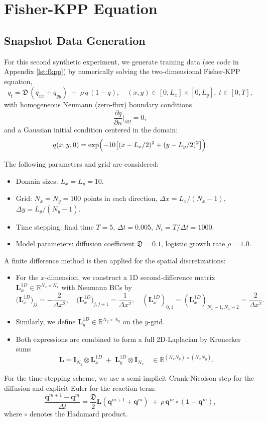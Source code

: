 \section{Fisher-KPP Equation}
\label{sec:fkpp_eq}

\subsection*{Snapshot Data Generation}

For this second synthetic experiment, we generate training data (see code in Appendix \ref{lst:fkpp}) by numerically solving the two-dimensional Fisher-KPP equation,\\
$$q_t = \mathfrak{D}\,(q_{xx} + q_{yy}) \;+\; \rho\,q\,(1 - q), \quad (x,y)\in[0,L_x]\times[0,L_y],\;t\in[0,T],$$
with homogeneous Neumann (zero-flux) boundary conditions\\
$$\frac{\partial q}{\partial n}\Big|_{\partial\Omega} = 0,$$
and a Gaussian initial condition centered in the domain:\\
$$q(x,y,0)= \exp\Bigl(-10\bigl[(x - L_x/2)^2 + (y - L_y/2)^2\bigr]\Bigr).$$

The following parameters and grid are considered:
\begin{itemize}
  \item Domain sizes: $L_x = L_y = 10$.
  \item Grid: $N_x = N_y = 100$ points in each direction, $\Delta x = L_x/(N_x-1)$, $\Delta y = L_y/(N_y-1)$.
  \item Time stepping: final time $T=5$, $\Delta t=0.005$, $N_t = T/\Delta t = 1000$.
  \item Model parameters: diffusion coefficient $\mathfrak{D}=0.1$, logistic growth rate $\rho=1.0$.
\end{itemize}
A finite difference method is then applied for the spatial discretizations:
\begin{itemize}
  \item For the $x$-dimension, we construct a 1D second-difference matrix $\mathbf{L}_x^{1D}\in\mathbb R^{N_x\times N_x}$ with Neumann BCs by\\
$$\bigl(\mathbf{L}_x^{1D}\bigr)_{jj}= -\frac{2}{\Delta x^2}, \quad \bigl(\mathbf{L}_x^{1D}\bigr)_{j,j\pm1}= \frac{1}{\Delta x^2},
      \quad (\mathbf{L}_x^{1D})_{0,1} = (\mathbf{L}_x^{1D})_{N_x-1,N_x-2} = \frac{2}{\Delta x^2}.$$
  \item Similarly, we define \(\mathbf{L}_y^{1D}\in\mathbb R^{N_y\times N_y}\) on the \(y\)-grid.
  \item Both expressions are combined to form a full 2D-Laplacian by Kronecker sums\\
    $$\mathbf{L} = \mathbf{I}_{N_y}\otimes \mathbf{L}_x^{1D} \;+\; \mathbf{L}_y^{1D}\otimes \mathbf{I}_{N_x}\quad\in\mathbb R^{(N_xN_y)\times(N_xN_y)}.$$
\end{itemize}
For the time-stepping scheme, we use a semi-implicit Crank-Nicolson step for the diffusion and explicit Euler for the reaction term:\\
$$\dfrac{\mathbf{q}^{m+1} - \mathbf{q}^{m}}{\Delta t} = \dfrac{\mathfrak{D}}{2}\mathbf{L}(\mathbf{q}^{m+1}+\mathbf{q}^m)\;+\,\rho\,\mathbf{q}^m\circ(\mathbf{1} - \mathbf{q}^m),$$ 
where $\circ$ denotes the Hadamard product.

